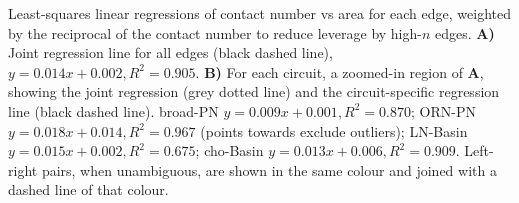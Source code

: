 Least-squares linear regressions of contact number vs area for each edge, weighted by the reciprocal of the contact number to reduce leverage by high-$n$ edges.
\textbf{A)} Joint regression line for all edges (black dashed line), $y = 0.014x + 0.002, R^2 = 0.905$.
\textbf{B)} For each circuit, a zoomed-in region of \textbf{A}, showing the joint regression (grey dotted line) and the circuit-specific regression line (black dashed line).
broad-PN $y = 0.009x + 0.001, R^2 = 0.870$;
ORN-PN $y = 0.018x + 0.014, R^2 = 0.967$ (\dagger points towards exclude outliers);
LN-Basin $y = 0.015x + 0.002, R^2 = 0.675$;
cho-Basin $y = 0.013x + 0.006, R^2 = 0.909$.
Left-right pairs, when unambiguous, are shown in the same colour and joined with a dashed line of that colour.